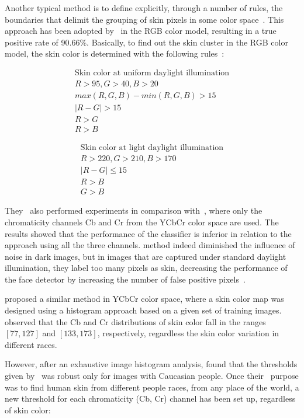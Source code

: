Another typical method is to define explicitly, through a number of rules, the boundaries that delimit the grouping of skin pixels in some color space~\citep{vezhnevets:03}. This approach has been adopted by~\citet{kovac:03} in the RGB color model, resulting in a true positive rate of 90.66\%. Basically, to find out the skin cluster in the RGB color model, the skin color is determined with the following rules~\citep{kovac:03}:

\begin{align*}
\text{Skin color at uniform daylight illumination}\\
R > 95, G > 40, B > 20 \\
max(R, G, B) - min(R, G, B) > 15 \\
|R - G| > 15 \\
R > G \\
R > B
\end{align*}

\begin{align*}
\text{Skin color at light daylight illumination}\\
R > 220, G > 210, B > 170 \\
|R - G| \leq 15 \\
R > B \\
G > B
\end{align*}

They~\citep{kovac:03} also performed experiments in comparison with~\citet{hsu:02}, where only the chromaticity channels Cb and Cr from the YCbCr color space are used. The results showed that the performance of the classifier is inferior in relation to the approach using all the three channels. \citet{hsu:02} method indeed diminished the influence of noise in dark images, but in images that are captured under standard daylight illumination, they label too many pixels as skin, decreasing the performance of the face detector by increasing the number of false positive pixels~\citep{kovac:03}.

\citet{chai:99} proposed a similar method in YCbCr color space, where a skin color map was designed using a histogram approach based on a given set of training images. \citet{chai:99} observed that the Cb and Cr distributions of skin color fall in the ranges $[77, 127]$ and $[133, 173]$, respectively, regardless the skin color variation in different races.

However, after an exhaustive image histogram analysis, \citet{basilio:11} found that the thresholds given by~\citet{chai:99} was robust only for images with Caucasian people. Once their~\citep{basilio:11} purpose was to find human skin from different people races, from any place of the world, a new threshold for each chromaticity (Cb, Cr) channel has been set up, regardless of skin  color:

